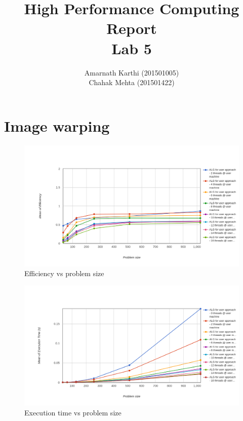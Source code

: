\documentclass[runningheads, a4paper, oribibl]{llncs}
\begin{document}
\mainmatter

\title{High Performance Computing Report\\Lab 5}


\author{Amarnath Karthi (201501005)\\Chahak Mehta (201501422)}%
%

\maketitle


\section{Image warping}
\begin{figure}[h!]
    \centering
    \includegraphics[scale = 0.3]{q1/mean_efficiency.png}
    \caption{Efficiency vs problem size}
    \label{fig:q1_eff}
\end{figure}

\begin{figure}[h!]
    \centering
    \includegraphics[scale = 0.3]{q1/mean_executionTime.png}
    \caption{Execution time vs problem size}
    \label{fig:q1_time}
\end{figure}
\end{document}
